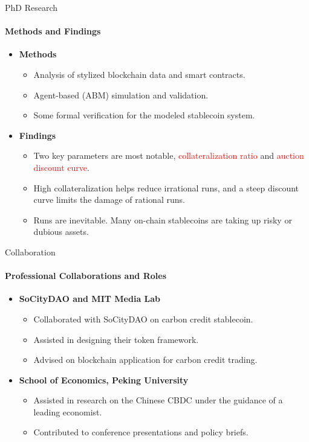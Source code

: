 \documentclass{beamer}
\begin{document}
\begin{frame}{PhD Research}
\framesubtitle{Methods and Findings}

\begin{itemize}
\item \textbf{Methods}
\begin{itemize}
\item Analysis of stylized blockchain data and smart contracts.
\item Agent-based (ABM) simulation and validation. 
\item Some formal verification for the modeled stablecoin system.
\end{itemize}

\item \textbf{Findings}
\begin{itemize}
\item Two key parameters are most notable, \textcolor{red}{collateralization ratio} and \textcolor{red}{auction discount curve}.
\item High collateralization helps reduce irrational runs, and a steep discount curve limits the damage of rational runs. 
\item Runs are inevitable. Many on-chain stablecoins are taking up risky or dubious assets.  
\end{itemize}
\end{itemize}
\end{frame}


\begin{frame}{Collaboration}
\framesubtitle{Professional Collaborations and Roles}
\begin{itemize}
\item \textbf{SoCityDAO and MIT Media Lab}
\begin{itemize}
\item Collaborated with SoCityDAO on carbon credit stablecoin.
\item Assisted in designing their token framework.
\item Advised on blockchain application for carbon credit trading.
\end{itemize}
\item \textbf{School of Economics, Peking University}
\begin{itemize}
\item Assisted in research on the Chinese CBDC under the guidance of a leading economist.
\item Contributed to conference presentations and policy briefs.
\end{itemize}
\end{itemize}
\end{frame}
\end{document}
